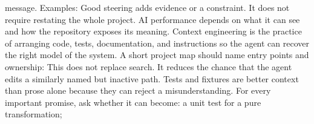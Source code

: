 {}message. Examples:\markdownRendererInterblockSeparator
{}\markdownRendererInterblockSeparator
{}\markdownRendererInterblockSeparator
{}\markdownRendererInterblockSeparator
{}Good steering adds evidence or a constraint. It does not require restating the\markdownRendererSoftLineBreak
{}whole project.\markdownRendererInterblockSeparator
{}\markdownRendererThematicBreak{}\markdownRendererInterblockSeparator
{}
\markdownRendererSectionEnd 
\markdownRendererSectionEnd \markdownRendererSectionBegin
{}\markdownRendererInterblockSeparator
{}AI performance depends on what it can see and how the repository exposes its\markdownRendererSoftLineBreak
{}meaning. Context engineering is the practice of arranging code, tests,\markdownRendererSoftLineBreak
{}documentation, and instructions so the agent can recover the right model of\markdownRendererSoftLineBreak
{}the system.\markdownRendererInterblockSeparator
{}\markdownRendererSectionBegin
{}\markdownRendererInterblockSeparator
{}A short project map should name entry points and ownership:\markdownRendererInterblockSeparator
{}\markdownRendererInterblockSeparator
{}This does not replace search. It reduces the chance that the agent edits a\markdownRendererSoftLineBreak
{}similarly named but inactive path.\markdownRendererInterblockSeparator
{}
\markdownRendererSectionEnd \markdownRendererSectionBegin
{}\markdownRendererInterblockSeparator
{}Tests and fixtures are better context than prose alone because they can reject\markdownRendererSoftLineBreak
{}a misunderstanding. For every important promise, ask whether it can become:\markdownRendererInterblockSeparator
{}\markdownRendererUlBegin
\markdownRendererUlItem a unit test for a pure transformation;\markdownRendererUlItemEnd 
